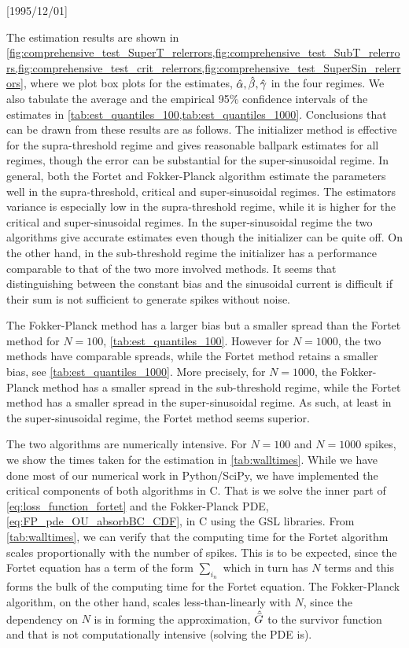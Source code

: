 \NeedsTeXFormat{LaTeX2e}[1995/12/01] \documentclass[10pt]{bmc_article}
\newenvironment{bmcformat}{\begin{raggedright}\baselineskip20pt\sloppy\setboolean{publ}{false}}{\end{raggedright}\baselineskip20pt\sloppy}
\begin{document}
\begin{bmcformat}
The estimation results are shown in
\cref{fig:comprehensive_test_SuperT_relerrors,fig:comprehensive_test_SubT_relerrors,fig:comprehensive_test_crit_relerrors,fig:comprehensive_test_SuperSin_relerrors},
where we plot box plots for the estimates, ${{{ \hat{{\alpha}} }, { \hat{{\beta}} }, { \hat{{\gamma }} }} }$ in the four regimes. We
also tabulate the average and the empirical 95\% confidence intervals of the
estimates in \cref{tab:est_quantiles_100,tab:est_quantiles_1000}. Conclusions
that can be drawn from these results are as follows. The initializer method is
effective for the supra-threshold regime and gives reasonable ballpark estimates
for all regimes, though the error can be substantial for the super-sinusoidal
regime. In general, both the Fortet and Fokker-Planck algorithm estimate the
parameters well in the supra-threshold, critical and super-sinusoidal regimes.
The estimators variance is especially low in the supra-threshold regime, while
it is higher for the critical and super-sinusoidal regimes. In the
super-sinusoidal regime the two algorithms give accurate estimates even though
the initializer can be quite off. On the other hand, in the sub-threshold regime
the initializer has a performance comparable to that of the two more involved
methods. It seems that distinguishing between the constant bias and the
sinusoidal current is difficult if their sum is not sufficient to generate
spikes without noise.


The Fokker-Planck method has a larger bias but a smaller spread than the Fortet
method for $N=100$, \cref{tab:est_quantiles_100}. However for
$N=1000$, the two methods have comparable 
spreads, while the Fortet method retains a smaller bias, see
\cref{tab:est_quantiles_1000}. More precisely, for $N=1000$, the Fokker-Planck
method has a smaller spread in the sub-threshold regime, while the Fortet method
has a smaller spread in the super-sinusoidal regime. As such, at least in the
super-sinusoidal regime, the Fortet method seems superior.

The two algorithms are numerically intensive. For $N=100$ and $N=1000$ spikes,
we show the times taken for the estimation in \cref{tab:walltimes}. While we
have done most of our numerical work in Python/SciPy\cite{scipy}, we have
implemented the critical components of both algorithms in C. That is we solve
the inner part of \cref{eq:loss_function_fortet} and the Fokker-Planck PDE,
\cref{eq:FP_pde_OU_absorbBC_CDF}, in C using the GSL libraries\cite{gsl}. From
\cref{tab:walltimes}, we can verify that the computing time for the Fortet
algorithm scales proportionally with the number of spikes. This is to be
expected, since the Fortet equation has a term of the form $\sum_{i_n}$ which in
turn has $N$ terms and this forms the bulk of the computing time for the
Fortet equation. The Fokker-Planck algorithm, on the other hand, scales
less-than-linearly with $N$, since the dependency on $N$ is in forming the
approximation, ${ \hat{{ \bar{G} }} }$ to the survivor function and that is not computationally
intensive (solving the PDE is).



\end{bmcformat}
\end{document}
